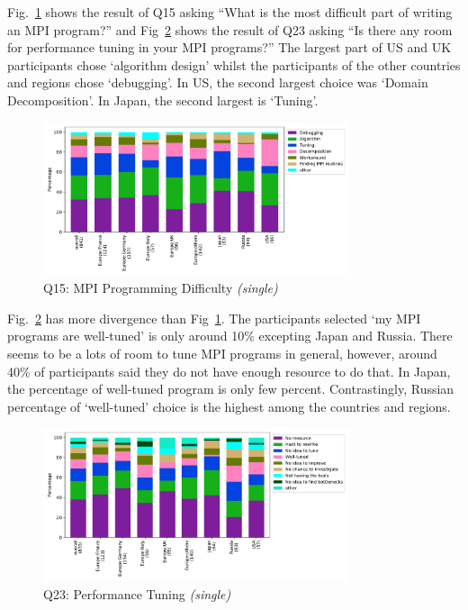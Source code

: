 \documentclass[conference,10pt,letterpaper]{IEEEtran}
\def\myquote#1{`#1'}
\begin{document}
Fig.~\ref{fig:difficulty} shows the result of Q15 asking ``What is the
most difficult part of writing an MPI program?'' and
Fig~\ref{fig:tuning} shows the result of Q23 asking ``Is there any
room for performance tuning in your MPI programs?'' The largest part
of US and UK participants chose \myquote{algorithm design} whilst the
participants of the other countries and regions chose
\myquote{debugging}. In US, the second largest choice was
\myquote{Domain Decomposition}. In Japan, the second largest is
\myquote{Tuning}. 

\begin{figure}[htb]
\begin{center}
\includegraphics[width=9cm]{Figs/Q15.pdf}
\caption{Q15: MPI Programming Difficulty {\it(single)}}
\label{fig:difficulty}
\end{center}
\end{figure}

Fig.~\ref{fig:tuning} has more divergence than
Fig~\ref{fig:difficulty}. The participants selected \myquote{my MPI
  programs are well-tuned} is only around 10\% excepting Japan and
Russia. There seems to be a lots of room to tune MPI programs in
general, however, around 40\% of participants said they do not have
enough resource to do that. In Japan, the percentage of well-tuned
program is only few percent. Contrastingly, Russian percentage of
\myquote{well-tuned} choice is the highest among the countries and
regions. 

\begin{figure}[htb]
\begin{center}
\includegraphics[width=9cm]{Figs/Q23.pdf}
\caption{Q23: Performance Tuning {\it(single)}}
\label{fig:tuning}
\end{center}
\end{figure}
\end{document}

